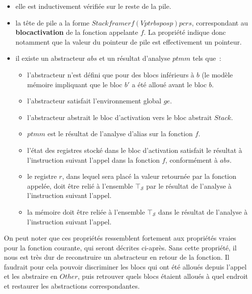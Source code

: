 \documentclass{article}
\newcommand\tS{\mathcal{S}}
\begin{document}
\begin{itemize}

\item elle est inductivement vérifiée sur le reste de la pile.

\item la tête de pile a la forme
$Stackframe r f (Vptr bsp osp) pc rs$,
correspondant au {\bf \gls{blocactivation}} de la fonction appelante
$f$. La propriété indique donc notamment que la valeur du pointeur
de pile est effectivement un pointeur.

\item il existe un abstracteur $abs$ et un résultat d'analyse
$ptmm$ tels que~:

\begin{itemize}

\item l'abstracteur n'est défini que pour des blocs inférieurs à
$b$ (le modèle mémoire impliquant que le bloc $b'$ a
été alloué avant le bloc $b$.

\item l'abstracteur satisfait l'environnement global $ge$.

\item l'abstracteur abstrait le bloc d'activation vers le bloc abstrait
$Stack$.

\item {}$ptmm$ est le résultat de l'analyse d'alias sur la fonction
$f$.

\item l'état des registres stocké dans le bloc d'activation satisfait le
résultat à l'instruction suivant l'appel dans la fonction $f$,
conformément à $abs$.

\item le registre $r$, dans lequel sera placé la valeur retournée
par la fonction appelée, doit être relié à l'ensemble $\top_\tS$ par le
résultat de l'analyse à l'instruction suivant l'appel.

\item la mémoire doit être reliée à l'ensemble $\top_\tS$ dans le résultat de
l'analyse à l'instruction suivant l'appel.

\end{itemize}

\end{itemize}

On peut noter que ces propriétés ressemblent fortement aux propriétés vraies
pour la fonction courante, qui seront décrites ci-après. Sans cette propriété,
il nous est très dur de reconstruire un abstracteur en retour de la fonction.
Il faudrait pour cela pouvoir discriminer les blocs qui ont été alloués depuis
l'appel et les abstraire en $Other$, puis retrouver quels blocs
étaient alloués à quel endroit et restaurer les abstractions correspondantes.
\end{document}
